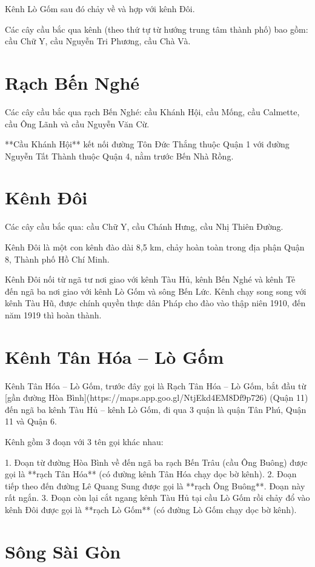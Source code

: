 Kênh Lò Gốm sau đó chảy về và hợp với kênh Đôi.

Các cây cầu bắc qua kênh (theo thứ tự từ hướng trung tâm thành phố) bao gồm: cầu Chữ Y, cầu Nguyễn Tri Phương, cầu Chà Và.

\section{Rạch Bến Nghé}

Các cây cầu bắc qua rạch Bến Nghé: cầu Khánh Hội, cầu Mống, cầu Calmette, cầu Ông Lãnh và cầu Nguyễn Văn Cừ.

**Cầu Khánh Hội** kết nối đường Tôn Đức Thắng thuộc Quận 1 với đường Nguyễn Tất Thành thuộc Quận 4, nằm trước Bến Nhà Rồng.

\section{Kênh Đôi}

Các cây cầu bắc qua: cầu Chữ Y, cầu Chánh Hưng, cầu Nhị Thiên Đường.

Kênh Đôi là một con kênh đào dài 8,5 km, chảy hoàn toàn trong địa phận Quận 8, Thành phố Hồ Chí Minh.

Kênh Đôi nối từ ngã tư nơi giao với kênh Tàu Hủ, kênh Bến Nghé và kênh Tẻ đến ngã ba nơi giao với kênh Lò Gốm và sông Bến Lức. Kênh chạy song song với kênh Tàu Hũ, được chính quyền thực dân Pháp cho đào vào thập niên 1910, đến năm 1919 thì hoàn thành.

\section{Kênh Tân Hóa – Lò Gốm}

Kênh Tân Hóa – Lò Gốm, trước đây gọi là Rạch Tân Hóa – Lò Gốm, bắt đầu từ [gần đường Hòa Bình](https://maps.app.goo.gl/NtjEkd4EM8Df9p726) (Quận 11) đến ngã ba kênh Tàu Hủ – kênh Lò Gốm, đi qua 3 quận là quận Tân Phú, Quận 11 và Quận 6.

Kênh gồm 3 đoạn với 3 tên gọi khác nhau:

1. Đoạn từ đường Hòa Bình về đến ngã ba rạch Bến Trâu (cầu Ông Buông) được gọi là **rạch Tân Hóa** (có đường kênh Tân Hóa chạy dọc bờ kênh).
2. Đoạn tiếp theo đến đường Lê Quang Sung được gọi là **rạch Ông Buông**. Đoạn này rất ngắn.
3. Đoạn còn lại cắt ngang kênh Tàu Hủ tại cầu Lò Gốm rồi chảy đổ vào kênh Đôi được gọi là **rạch Lò Gốm** (có đường Lò Gốm chạy dọc bờ kênh).

\section{Sông Sài Gòn}

